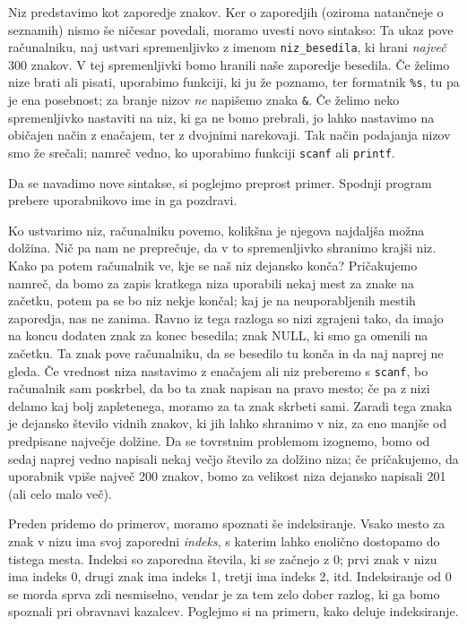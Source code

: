 \documentclass{book}
\begin{document}
Niz predstavimo kot zaporedje znakov.
Ker o zaporedjih (oziroma natančneje o seznamih) nismo še ničesar povedali,
moramo uvesti novo sintakso:
Ta ukaz pove računalniku, naj ustvari spremenljivko z imenom
\verb+niz_besedila+, ki hrani \emph{največ} 300 znakov.
V tej spremenljivki bomo hranili naše zaporedje besedila.
Če želimo nize brati ali pisati, uporabimo funkciji, ki ju že poznamo, ter
formatnik \verb+%s+, tu pa je ena posebnost; za branje nizov \emph{ne}
napišemo znaka \verb+&+.
Če želimo neko spremenljivko nastaviti na niz, ki ga ne bomo prebrali, jo lahko
nastavimo na običajen način z enačajem, ter z dvojnimi narekovaji.
Tak način podajanja nizov smo že srečali; namreč vedno, ko uporabimo funkciji
\verb+scanf+ ali \verb+printf+.

\begin{examples}
  Da se navadimo nove sintakse, si poglejmo preprost primer.
  Spodnji program prebere uporabnikovo ime in ga pozdravi.
\end{examples}

Ko ustvarimo niz, računalniku povemo, kolikšna je njegova najdaljša možna
dolžina.
Nič pa nam ne preprečuje, da v to spremenljivko shranimo krajši niz.
Kako pa potem računalnik ve, kje se naš niz dejansko konča?
Pričakujemo namreč, da bomo za zapis kratkega niza uporabili nekaj mest za znake
na začetku, potem pa se bo niz nekje končal; kaj je na neuporabljenih mestih
zaporedja, nas ne zanima.
Ravno iz tega razloga so nizi zgrajeni tako, da imajo na koncu dodaten znak za
konec besedila; znak NULL, ki smo ga omenili na začetku.
Ta znak pove računalniku, da se besedilo tu konča in da naj naprej ne gleda.
Če vrednost niza nastavimo z enačajem ali niz preberemo s \verb+scanf+, bo
računalnik sam poskrbel, da bo ta znak napisan na pravo mesto; če pa z nizi
delamo kaj bolj zapletenega, moramo za ta znak skrbeti sami.
Zaradi tega znaka je dejansko število vidnih znakov, ki jih lahko shranimo v
niz, za eno manjše od predpisane največje dolžine.
Da se tovrstnim problemom izognemo, bomo od sedaj naprej vedno napisali nekaj
večjo število za dolžino niza; če pričakujemo, da uporabnik vpiše največ 200
znakov, bomo za velikost niza dejansko napisali 201 (ali celo malo več).

Preden pridemo do primerov, moramo spoznati še indeksiranje.
Vsako mesto za znak v nizu ima svoj zaporedni \textit{indeks}, s katerim
lahko enolično dostopamo do tistega mesta.
Indeksi so zaporedna števila, ki se začnejo z 0; prvi znak v nizu ima indeks 0,
drugi znak ima indeks 1, tretji ima indeks 2, itd.
Indeksiranje od 0 se morda sprva zdi nesmiselno, vendar je za tem zelo dober
razlog, ki ga bomo spoznali pri obravnavi kazalcev.
Poglejmo si na primeru, kako deluje indeksiranje.
\end{document}
